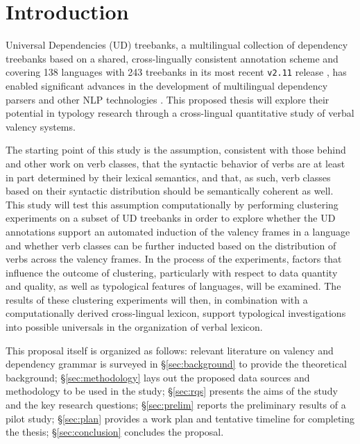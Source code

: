 \section{Introduction}\label{sec:intro}

Universal Dependencies (UD) treebanks, a multilingual collection of dependency treebanks based on a shared, cross-lingually consistent annotation scheme \citep{nivre2020} and covering 138 languages with 243 treebanks in its most recent \texttt{v2.11} release \citep{universaldep}, has enabled significant advances in the development of multilingual dependency parsers and other NLP technologies \citep{zeman2017, zeman2018}. This proposed thesis will explore their potential in typology research through a cross-lingual quantitative study of verbal valency systems.

The starting point of this study is the assumption, consistent with those behind \citet{levin1993} and other work on verb classes, that the syntactic behavior of verbs are at least in part determined by their lexical semantics, and that, as such, verb classes based on their syntactic distribution should be semantically coherent as well. This study will test this assumption computationally by performing clustering experiments on a subset of UD treebanks in order to explore whether the UD annotations support an automated induction of the valency frames in a language and whether verb classes can be further inducted based on the distribution of verbs across the valency frames. In the process of the experiments, factors that influence the outcome of clustering, particularly with respect to data quantity and quality, as well as typological features of languages, will be examined. The results of these clustering experiments will then, in combination with a computationally derived cross-lingual lexicon, support typological investigations into possible universals in the organization of verbal lexicon.

This proposal itself is organized as follows: relevant literature on valency and dependency grammar is surveyed in \S\ref{sec:background} to provide the theoretical background; \S\ref{sec:methodology} lays out the proposed data sources and methodology to be used in the study; \S\ref{sec:rqs} presents the aims of the study and the key research questions; \S\ref{sec:prelim} reports the preliminary results of a pilot study; \S\ref{sec:plan} provides a work plan and tentative timeline for completing the thesis; \S\ref{sec:conclusion} concludes the proposal.